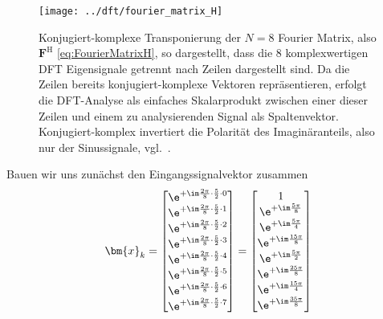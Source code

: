 \begin{figure}
\centering
\texttt{[image: ../dft/fourier\_matrix\_H]}
\caption{Konjugiert-komplexe Transponierung der $N=8$ Fourier Matrix,
also $\bm{F}^\mathrm{H}$ \eqref{eq:FourierMatrixH}, so dargestellt, dass
die 8 komplexwertigen DFT Eigensignale getrennt nach Zeilen dargestellt sind.
Da die Zeilen bereits konjugiert-komplexe Vektoren repräsentieren, erfolgt die
DFT-Analyse als einfaches Skalarprodukt zwischen einer dieser Zeilen und einem
zu analysierenden Signal als Spaltenvektor.
Konjugiert-komplex invertiert die Polarität des Imaginäranteils, also nur der Sinussignale,
vgl.~.
}
\label{fig:fourier_matrixH}
\end{figure}


\begin{ExCalc}
Bauen wir uns zunächst den Eingangssignalvektor zusammen
\begin{align}
\bm{x}_k =
\begin{bmatrix}
\e^{+\im \frac{2\pi}{8} \cdot \frac{5}{2} \cdot 0}\\
\e^{+\im \frac{2\pi}{8} \cdot \frac{5}{2} \cdot 1}\\
\e^{+\im \frac{2\pi}{8} \cdot \frac{5}{2} \cdot 2}\\
\e^{+\im \frac{2\pi}{8} \cdot \frac{5}{2} \cdot 3}\\
\e^{+\im \frac{2\pi}{8} \cdot \frac{5}{2} \cdot 4}\\
\e^{+\im \frac{2\pi}{8} \cdot \frac{5}{2} \cdot 5}\\
\e^{+\im \frac{2\pi}{8} \cdot \frac{5}{2} \cdot 6}\\
\e^{+\im \frac{2\pi}{8} \cdot \frac{5}{2} \cdot 7}
\end{bmatrix}
=
\begin{bmatrix}
1\\
\e^{+\im \frac{5\pi}{8}}\\
\e^{+\im \frac{5\pi}{4}}\\
\e^{+\im \frac{15\pi}{8}}\\
\e^{+\im \frac{5\pi}{2}}\\
\e^{+\im \frac{25\pi}{8}}\\
\e^{+\im \frac{15\pi}{4}}\\
\e^{+\im \frac{35\pi}{8}}
\end{bmatrix}
\end{align}



\end{ExCalc}
